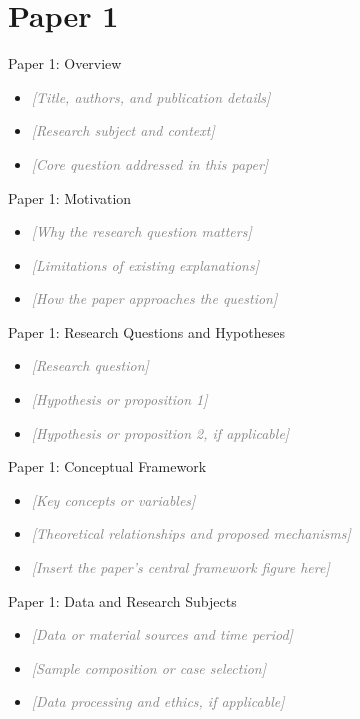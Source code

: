 \documentclass[aspectratio=169]{beamer}
\newcommand{\fillin}[1]{\textcolor{gray}{\textit{[#1]}}}
\begin{document}
\section{Paper 1}

\begin{frame}{Paper 1: Overview}
  \begin{itemize}
    \item \fillin{Title, authors, and publication details}
    \item \fillin{Research subject and context}
    \item \fillin{Core question addressed in this paper}
  \end{itemize}
\end{frame}

\begin{frame}{Paper 1: Motivation}
  \begin{itemize}
    \item \fillin{Why the research question matters}
    \item \fillin{Limitations of existing explanations}
    \item \fillin{How the paper approaches the question}
  \end{itemize}
\end{frame}

\begin{frame}{Paper 1: Research Questions and Hypotheses}
  \begin{itemize}
    \item \fillin{Research question}
    \item \fillin{Hypothesis or proposition 1}
    \item \fillin{Hypothesis or proposition 2, if applicable}
  \end{itemize}
\end{frame}

\begin{frame}{Paper 1: Conceptual Framework}
  \begin{itemize}
    \item \fillin{Key concepts or variables}
    \item \fillin{Theoretical relationships and proposed mechanisms}
    \item \fillin{Insert the paper's central framework figure here}
  \end{itemize}
\end{frame}

\begin{frame}{Paper 1: Data and Research Subjects}
  \begin{itemize}
    \item \fillin{Data or material sources and time period}
    \item \fillin{Sample composition or case selection}
    \item \fillin{Data processing and ethics, if applicable}
  \end{itemize}
\end{frame}
\end{document}
